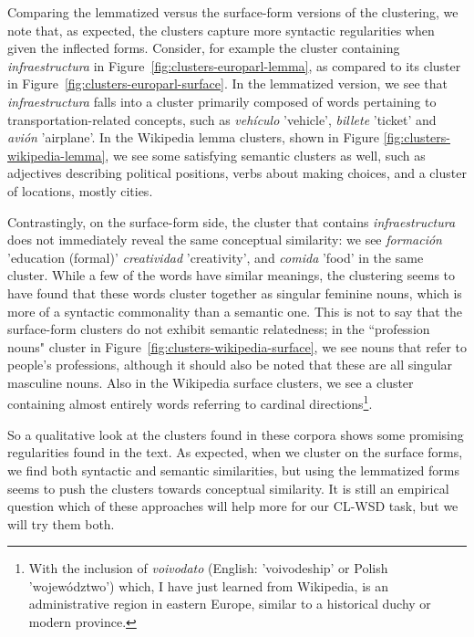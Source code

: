 Comparing the lemmatized versus the surface-form versions of the clustering, we
note that, as expected, the clusters capture more syntactic regularities when
given the inflected forms. Consider, for example the cluster containing
\emph{infraestructura} in Figure~\ref{fig:clusters-europarl-lemma}, as compared
to its cluster in Figure~\ref{fig:clusters-europarl-surface}. In the lemmatized
version, we see that \emph{infraestructura} falls into a cluster primarily
composed of words pertaining to transportation-related concepts, such as
\emph{vehículo} 'vehicle', \emph{billete} 'ticket' and \emph{avión} 'airplane'.
In the Wikipedia lemma clusters, shown in Figure
\ref{fig:clusters-wikipedia-lemma}, we see some satisfying semantic clusters as
well, such as adjectives describing political positions, verbs about making
choices, and a cluster of locations, mostly cities.

Contrastingly, on the surface-form side, the cluster that contains
\emph{infraestructura} does not immediately reveal the same conceptual
similarity: we see \emph{formación} 'education (formal)' \emph{creatividad}
'creativity', and \emph{comida} 'food' in the same cluster. While a few of the
words have similar meanings, the clustering seems to have found that these
words cluster together as singular feminine nouns, which is more of a
syntactic commonality than a semantic one. This is not to say that the
surface-form clusters do not exhibit semantic relatedness; in the ``profession
nouns" cluster in Figure~\ref{fig:clusters-wikipedia-surface}, we see nouns
that refer to people's professions, although it should also be noted that these
are all singular masculine nouns. Also in the Wikipedia surface clusters, we
see a cluster containing almost entirely words referring to cardinal
directions\footnote{With the inclusion of \emph{voivodato} (English:
'voivodeship' or Polish 'województwo') which, I have just learned from
Wikipedia, is an administrative region in eastern Europe, similar to a
historical duchy or modern province.}.

So a qualitative look at the clusters found in these corpora shows some
promising regularities found in the text. As expected, when we cluster on the
surface forms, we find both syntactic and semantic similarities, but using the
lemmatized forms seems to push the clusters towards conceptual similarity. It
is still an empirical question which of these approaches will help more for our
CL-WSD task, but we will try them both.

